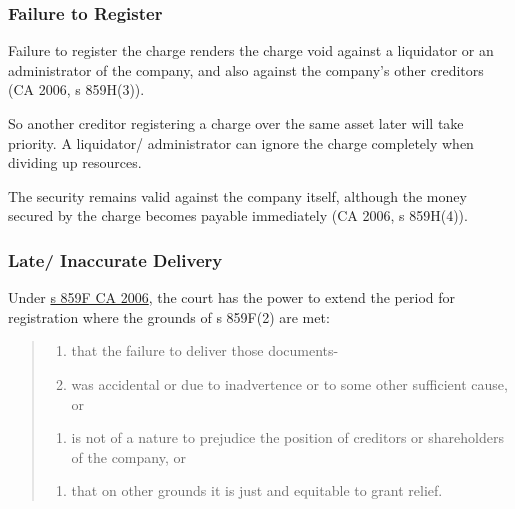 \documentclass[
]{article}
\newenvironment{Shaded}{}{}
\newcommand{\NormalTok}[1]{#1}
\providecommand{\tightlist}{%
  \setlength{\itemsep}{0pt}\setlength{\parskip}{0pt}}
\begin{document}
\hypertarget{failure-to-register}{%
\subsubsection{Failure to Register}\label{failure-to-register}}

\begin{Shaded}
\begin{Highlighting}[]
\NormalTok{Failure to register the charge renders the charge void against a liquidator or an administrator of the company, and also against the company’s other creditors (CA 2006, s 859H(3)).}
\end{Highlighting}
\end{Shaded}

So another creditor registering a charge over the same asset later will
take priority. A liquidator/ administrator can ignore the charge
completely when dividing up resources.

The security remains valid against the company itself, although the
money secured by the charge becomes payable immediately (CA 2006, s
859H(4)).

\hypertarget{late-inaccurate-delivery}{%
\subsubsection{Late/ Inaccurate
Delivery}\label{late-inaccurate-delivery}}

Under \href{https://www.legislation.gov.uk/ukpga/2006/46/section/859F}{s
859F CA 2006}, the court has the power to extend the period for
registration where the grounds of s 859F(2) are met:

\begin{quote}
\begin{enumerate}
\def\labelenumi{(\alph{enumi})}
\tightlist
\item
  that the failure to deliver those documents-\\
\item
  was accidental or due to inadvertence or to some other sufficient
  cause, or\\
\end{enumerate}

\begin{enumerate}
\def\labelenumi{(\roman{enumi})}
\setcounter{enumi}{1}
\tightlist
\item
  is not of a nature to prejudice the position of creditors or
  shareholders of the company, or\\
\end{enumerate}

\begin{enumerate}
\def\labelenumi{(\alph{enumi})}
\setcounter{enumi}{1}
\tightlist
\item
  that on other grounds it is just and equitable to grant relief.
\end{enumerate}
\end{quote}
\end{document}
